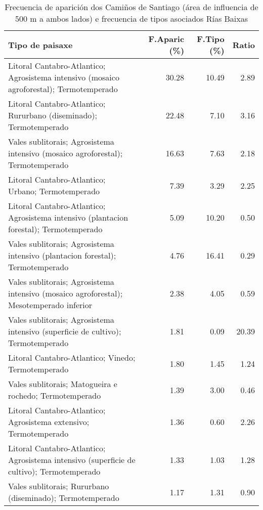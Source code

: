 \begin{table}[p]
\centering
\caption{Frecuencia de aparición dos Camiños de Santiago (área de influencia de 500 m a ambos lados) e frecuencia de tipos asociados Rías Baixas} 
\label{vcamino12}
\begin{tabular}{lrrr}
  \hline
Tipo de paisaxe & F.Aparic (\%) & F.Tipo (\%) & Ratio \\ 
  \hline
Litoral Cantabro-Atlantico; Agrosistema intensivo (mosaico agroforestal); Termotemperado & 30.28 & 10.49 & 2.89 \\ 
  Litoral Cantabro-Atlantico; Rururbano (diseminado); Termotemperado & 22.48 & 7.10 & 3.16 \\ 
  Vales sublitorais; Agrosistema intensivo (mosaico agroforestal); Termotemperado & 16.63 & 7.63 & 2.18 \\ 
  Litoral Cantabro-Atlantico; Urbano; Termotemperado & 7.39 & 3.29 & 2.25 \\ 
  Litoral Cantabro-Atlantico; Agrosistema intensivo (plantacion forestal); Termotemperado & 5.09 & 10.20 & 0.50 \\ 
  Vales sublitorais; Agrosistema intensivo (plantacion forestal); Termotemperado & 4.76 & 16.41 & 0.29 \\ 
  Vales sublitorais; Agrosistema intensivo (mosaico agroforestal); Mesotemperado inferior & 2.38 & 4.05 & 0.59 \\ 
  Vales sublitorais; Agrosistema intensivo (superficie de cultivo); Termotemperado & 1.81 & 0.09 & 20.39 \\ 
  Litoral Cantabro-Atlantico; Vinedo; Termotemperado & 1.80 & 1.45 & 1.24 \\ 
  Vales sublitorais; Matogueira e rochedo; Termotemperado & 1.39 & 3.00 & 0.46 \\ 
  Litoral Cantabro-Atlantico; Agrosistema extensivo; Termotemperado & 1.36 & 0.60 & 2.26 \\ 
  Litoral Cantabro-Atlantico; Agrosistema intensivo (superficie de cultivo); Termotemperado & 1.33 & 1.03 & 1.28 \\ 
  Vales sublitorais; Rururbano (diseminado); Termotemperado & 1.17 & 1.31 & 0.90 \\ 
   \hline
\end{tabular}
\end{table}
